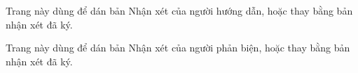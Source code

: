 \thispagestyle{empty}
\vspace*{\fill}
\begin{center}
Trang này dùng để dán bản Nhận xét của người hướng dẫn, hoặc thay bằng bản nhận xét đã ký.
\end{center}
\vspace*{\fill}
\newpage

\thispagestyle{empty}
\vspace*{\fill}
\begin{center}
Trang này dùng để dán bản Nhận xét của người phản biện, hoặc thay bằng bản nhận xét đã ký.
\end{center}
\vspace*{\fill}
\newpage
